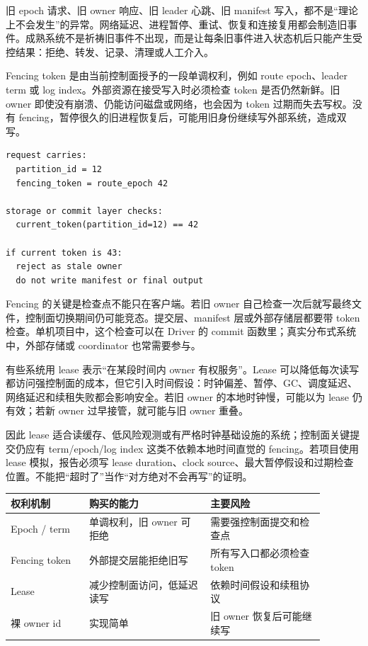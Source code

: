 旧 epoch 请求、旧 owner 响应、旧 leader 心跳、旧 manifest 写入，都不是“理论上不会发生”的异常。网络延迟、进程暂停、重试、恢复和连接复用都会制造旧事件。成熟系统不是祈祷旧事件不出现，而是让每条旧事件进入状态机后只能产生受控结果：拒绝、转发、记录、清理或人工介入。

Fencing token 是由当前控制面授予的一段单调权利，例如 route epoch、leader term 或 log index。外部资源在接受写入时必须检查 token 是否仍然新鲜。旧 owner 即使没有崩溃、仍能访问磁盘或网络，也会因为 token 过期而失去写权。没有 fencing，暂停很久的旧进程恢复后，可能用旧身份继续写外部系统，造成双写。

\begin{lstlisting}[numbers=none,caption={Fencing 的判定形态}]
request carries:
  partition_id = 12
  fencing_token = route_epoch 42

storage or commit layer checks:
  current_token(partition_id=12) == 42

if current token is 43:
  reject as stale owner
  do not write manifest or final output
\end{lstlisting}

Fencing 的关键是检查点不能只在客户端。若旧 owner 自己检查一次后就写最终文件，控制面切换期间仍可能竞态。提交层、manifest 层或外部存储层都要带 token 检查。单机项目中，这个检查可以在 Driver 的 commit 函数里；真实分布式系统中，外部存储或 coordinator 也常需要参与。

有些系统用 lease 表示“在某段时间内 owner 有权服务”。Lease 可以降低每次读写都访问强控制面的成本，但它引入时间假设：时钟偏差、暂停、GC、调度延迟、网络延迟和续租失败都会影响安全。若旧 owner 的本地时钟慢，可能以为 lease 仍有效；若新 owner 过早接管，就可能与旧 owner 重叠。

因此 lease 适合读缓存、低风险观测或有严格时钟基础设施的系统；控制面关键提交仍应有 term/epoch/log index 这类不依赖本地时间直觉的 fencing。若项目使用 lease 模拟，报告必须写 lease duration、clock source、最大暂停假设和过期检查位置。不能把“超时了”当作“对方绝对不会再写”的证明。

\begin{center}
\begin{tabular}{p{0.22\linewidth}p{0.34\linewidth}p{0.32\linewidth}}
\toprule
权利机制 & 购买的能力 & 主要风险 \\
\midrule
Epoch / term & 单调权利，旧 owner 可拒绝 & 需要强控制面提交和检查点 \\
Fencing token & 外部提交层能拒绝旧写 & 所有写入口都必须检查 token \\
Lease & 减少控制面访问，低延迟读写 & 依赖时间假设和续租协议 \\
裸 owner id & 实现简单 & 旧 owner 恢复后可能继续写 \\
\bottomrule
\end{tabular}
\end{center}

